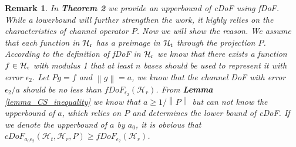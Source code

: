 \documentclass[12pt,draftclsnofoot,journal,onecolumn]{IEEEtran}
\newtheorem{remark}{Remark}
\begin{document}
	{\color{red}
	\begin{remark}
		In {\bf Theorem 2} we provide an upperbound of cDoF using fDoF. While a lowerbound will further strengthen the work, it highly relies on the characteristics of channel operator $P$. Now we will show the reason. We assume that each function in $\mathcal{H}_{\rm r}$ has a preimage in $\mathcal{H}_{\rm t}$ through the projection $P$. According to the definition of fDoF in $\mathcal{H}_{\rm r}$ we know that there exists a function $f\in \mathcal{H}_{\rm r}$ with modulus 1 that at least $n$ bases should be used to represent it with error $\epsilon_2$. Let $Pg = f$ and $\left\| g\right\| = a$, we know that the channel DoF with error $\epsilon_2/a$ should be no less than $fDoF_{\epsilon_2}(\mathcal{H}_r)$. From {\bf Lemma} \ref{lemma_CS_inequality} we know that $a \geqslant 1/\left\|  P \right\|$ but can not know the upperbound of $a$, which relies on $P$ and determines the lower bound of cDoF. If we denote the upperbound of $a$ by $a_0$, it is obvious that $cDoF_{a_0\epsilon_2}(\mathcal{H}_t,\mathcal{H}_r,P)\geqslant fDoF_{\epsilon_2}(\mathcal{H}_r)$. 
	
	\end{remark}
	}
\end{document}
